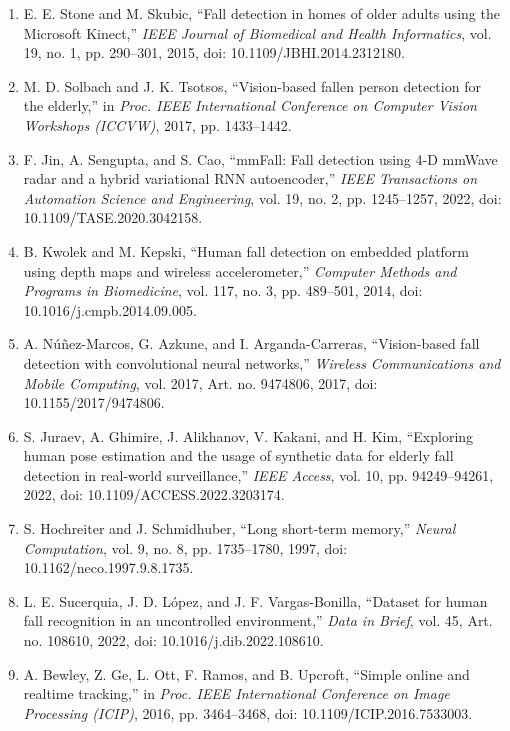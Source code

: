 \begin{enumerate}
    \item \label{ref:kinect_fall} E. E. Stone and M. Skubic, ``Fall detection in homes of older adults using the Microsoft Kinect,'' \textit{IEEE Journal of Biomedical and Health Informatics}, vol. 19, no. 1, pp. 290--301, 2015, doi: 10.1109/JBHI.2014.2312180.
    \item \label{ref:stereo_fall} M. D. Solbach and J. K. Tsotsos, ``Vision-based fallen person detection for the elderly,'' in \textit{Proc. IEEE International Conference on Computer Vision Workshops (ICCVW)}, 2017, pp. 1433--1442.
    \item \label{ref:mmfall} F. Jin, A. Sengupta, and S. Cao, ``mmFall: Fall detection using 4-D mmWave radar and a hybrid variational RNN autoencoder,'' \textit{IEEE Transactions on Automation Science and Engineering}, vol. 19, no. 2, pp. 1245--1257, 2022, doi: 10.1109/TASE.2020.3042158.
    \item \label{ref:kwolek_fusion} B. Kwolek and M. Kepski, ``Human fall detection on embedded platform using depth maps and wireless accelerometer,'' \textit{Computer Methods and Programs in Biomedicine}, vol. 117, no. 3, pp. 489--501, 2014, doi: 10.1016/j.cmpb.2014.09.005.
    \item \label{ref:opticalflow_fall} A. Núñez-Marcos, G. Azkune, and I. Arganda-Carreras, ``Vision-based fall detection with convolutional neural networks,'' \textit{Wireless Communications and Mobile Computing}, vol. 2017, Art. no. 9474806, 2017, doi: 10.1155/2017/9474806.
    \item \label{ref:pose_synthetic} S. Juraev, A. Ghimire, J. Alikhanov, V. Kakani, and H. Kim, ``Exploring human pose estimation and the usage of synthetic data for elderly fall detection in real-world surveillance,'' \textit{IEEE Access}, vol. 10, pp. 94249--94261, 2022, doi: 10.1109/ACCESS.2022.3203174.
    \item \label{ref:lstm} S. Hochreiter and J. Schmidhuber, ``Long short-term memory,'' \textit{Neural Computation}, vol. 9, no. 8, pp. 1735--1780, 1997, doi: 10.1162/neco.1997.9.8.1735.
    \item \label{ref:caucafall} L. E. Sucerquia, J. D. López, and J. F. Vargas-Bonilla, ``Dataset for human fall recognition in an uncontrolled environment,'' \textit{Data in Brief}, vol. 45, Art. no. 108610, 2022, doi: 10.1016/j.dib.2022.108610.
    \item \label{ref:sort} A. Bewley, Z. Ge, L. Ott, F. Ramos, and B. Upcroft, ``Simple online and realtime tracking,'' in \textit{Proc. IEEE International Conference on Image Processing (ICIP)}, 2016, pp. 3464--3468, doi: 10.1109/ICIP.2016.7533003.

\end{enumerate}
